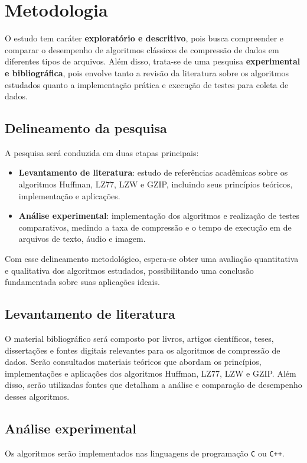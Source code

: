 \chapter{Metodologia}
\label{c.metodologia}

O estudo tem caráter \textbf{exploratório e descritivo}, pois busca compreender e comparar o desempenho de algoritmos clássicos de compressão de dados em diferentes tipos de arquivos. Além disso, trata-se de uma pesquisa \textbf{experimental e bibliográfica}, pois envolve tanto a revisão da literatura sobre os algoritmos estudados quanto a implementação prática e execução de testes para coleta de dados.

\section{Delineamento da pesquisa}

A pesquisa será conduzida em duas etapas principais:

\begin{itemize}
    \item \textbf{Levantamento de literatura}: estudo de referências acadêmicas sobre os algoritmos Huffman, LZ77, LZW e GZIP, incluindo seus princípios teóricos, implementação e aplicações.
    \item \textbf{Análise experimental}: implementação dos algoritmos e realização de testes comparativos, medindo a taxa de compressão e o tempo de execução em de arquivos de texto, áudio e imagem.
\end{itemize}

Com esse delineamento metodológico, espera-se obter uma avaliação quantitativa e qualitativa dos algoritmos estudados, possibilitando uma conclusão fundamentada sobre suas aplicações ideais.

\section{Levantamento de literatura}
O material bibliográfico será composto por livros, artigos científicos, teses, dissertações e fontes digitais relevantes para os algoritmos de compressão de dados. Serão consultados materiais teóricos que abordam os princípios, implementações e aplicações dos algoritmos Huffman, LZ77, LZW e GZIP. Além disso, serão utilizadas fontes que detalham a análise e comparação de desempenho desses algoritmos.

\section{Análise experimental}
Os algoritmos serão implementados nas linguagens de programação \texttt{C} ou \texttt{C++}. 

